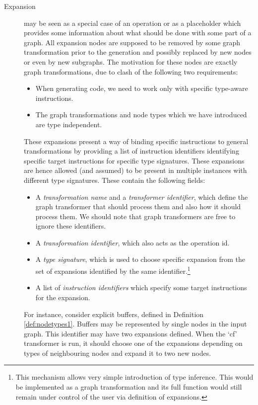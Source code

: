 \begin{description}
\begin{itemize}
    \end{itemize}
  \item[Expansion] may be seen as a special case of an operation or as a placeholder which provides some information about what should be done with some part of a graph. All expansion nodes are supposed to be removed by some graph transformation prior to the generation and possibly replaced by new nodes or even by new subgraphs. The motivation for these nodes are exactly graph transformations, due to clash of the following two requirements:
    \begin{itemize}
      \item When generating code, we need to work only with specific type-aware instructions. 
      \item The graph transformations and node types which we have introduced are type independent. 
    \end{itemize}
    These expansions present a way of binding specific instructions to general transformations by providing a list of instruction identifiers identifying specific target instructions for specific type signatures. These expansions are hence allowed (and assumed) to be present in multiple instances with different type signatures. These contain the following fields:
    \begin{itemize}
      \item A \emph{transformation name} and a \emph{transformer identifier}, which define the graph transformer that should process them and also how it  should process them. We should note that graph transformers are free to ignore these identifiers.
      \item A \emph{transformation identifier}, which also acts as the operation id.
      \item A \emph{type signature}, which is used to choose specific expansion from the set of expansions identified by the same identifier.\footnote{This mechanism allows very simple introduction of type inference. This would be implemented as a graph transformation and its full function would still remain under control of the user via definition of expansions.}
      \item A list of \emph{instruction identifiers} which specify some target instructions for the expansion.
    \end{itemize}
    For instance, consider explicit buffers, defined in Definition \ref{def:nodetypes1}. Buffers may be represented by single nodes in the input graph. This identifier may have two expansions defined. When the `cf' transformer is run, it should choose one of the expansions depending on types of neighbouring nodes and expand it to two new nodes.

\end{description}
